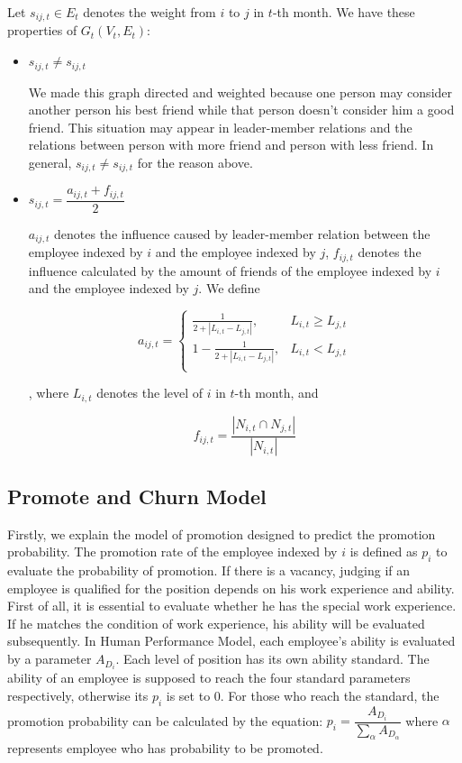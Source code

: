 \documentclass[12pt,a4paper,titlepage]{article}
\begin{document}
Let $s_{ij,t}\in E_t$ denotes the weight from $i$ to $j$ in $t$-th
month. We have these properties of $G_t(V_t,E_t)$:

\begin{itemize}
\item $s_{ij,t} \ne s_{ij,t}$

  We made this graph directed and weighted because one person may
  consider another person his best friend while that person doesn't
  consider him a good friend. This situation may appear in leader-member relations and the relations between person with more friend and person with less friend. In
  general, $s_{ij,t} \ne s_{ij,t}$ for the reason above.

\item $s_{ij,t}=\dfrac{a_{ij,t}+f_{ij,t}}{2}$

  $a_{ij,t}$ denotes the influence caused by leader-member relation
  between the employee indexed by $i$ and the employee indexed by $j$,
  $f_{ij,t}$ denotes the influence calculated by the amount of friends
  of the employee indexed by $i$ and the employee indexed by $j$. We define

\begin{equation}
a_{ij,t}=\begin{cases}
  \frac{1}{2+\left|L_{i,t}-L_{j,t}\right|}, & L_{i,t} \ge L_{j,t} \\
  1-\frac{1}{2+\left|L_{i,t}-L_{j,t}\right|}, & L_{i,t} < L_{j,t} \\
\end{cases}
\end{equation}

, where $L_{i,t}$ denotes the level of $i$ in $t$-th month, and

\begin{equation}
f_{ij,t}=\frac{\left|N_{i,t} \cap
    N_{j,t}\right|}{\left|N_{i,t}\right|}
\end{equation}

\end{itemize}

\subsection{Promote and Churn Model}
\label{sec:promote-and-churn-model}

Firstly, we explain the model of promotion designed to predict the
promotion probability. The promotion rate of the employee indexed by $i$ is defined as
$p_i$ to evaluate the probability of promotion. If
there is a vacancy, judging if an employee is qualified for the
position depends on his work experience and ability. First of all, it
is essential to evaluate whether he has the special work
experience. If he matches the condition of work experience, his
ability will be evaluated subsequently. In Human Performance Model,
each employee's
ability is evaluated by a parameter $A_{D_i}$. Each level of
position has its own ability standard. The ability
of an employee is supposed to reach the four standard parameters
respectively, otherwise its $p_i$ is set to 0. For those who reach the
standard, the promotion probability can be calculated by the equation:
$p_i =\dfrac{A_{D_i}}{\sum_{\alpha} A_{D_\alpha}}$ where $\alpha$ represents
employee who has probability to be promoted.
\end{document}
